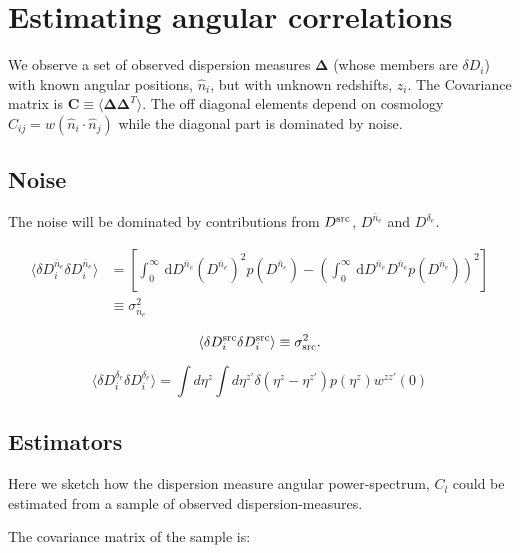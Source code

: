 \documentclass[onecolumn,prd,noshowpacs,nofootinbib,amsmath,amssymb]{revtex4}
\newcommand{\Dne}{D^{\bar{n}_e}}
\newcommand{\Dde}{D^{\delta_e}}
\newcommand{\Dsrc}{D^{\rm src}}
\newcommand{\ud}{\,\mathrm{d}}
\begin{document}
\section{Estimating angular correlations}

We observe a set of observed dispersion measures
$\boldsymbol \Delta$ (whose members are $\delta D_i$)
with known angular positions, $\hat n_i$, but with unknown
redshifts, $z_i$.  The Covariance matrix is
${\boldsymbol C} \equiv
\langle \boldsymbol \Delta \boldsymbol \Delta^T \rangle$.
The off diagonal elements depend on cosmology
$C_{ij} = w(\hat{n}_i\cdot\hat{n}_j)$ while the diagonal part is dominated by noise.

\subsection{Noise}

The noise will be dominated by contributions from $\Dsrc$, $\Dne$ and $\Dde$.

\begin{align}
    \label{e:sig_nebar}
    \langle \delta D^{\bar{n}_e}_i \delta D^{\bar{n}_e}_i \rangle
        &= \left[ \int_0^\infty \ud D^{\bar{n}_e} (D^{\bar{n}_e})^2
            p(D^{\bar{n}_e})
            - \left( \int_0^\infty \ud D^{\bar{n}_e} D^{\bar{n}_e}
        p(D^{\bar{n}_e}) \right)^2 \right]\\
        &\equiv  \sigma_{\bar{n}_e}^2
\end{align}

\begin{equation}
    \label{e:sig_src}
    \langle \delta D^{\rm src}_i \delta D^{\rm src}_i \rangle
    \equiv \sigma^2_{\rm src}.
\end{equation}

\begin{equation}
    \label{e:sig_delta}
    \langle \delta \Dde_i \delta \Dde_i \rangle
		= \int d\eta^z \int d\eta^{z'} \delta(\eta^z - \eta^{z'}) 
		p(\eta^{z}) w^{z z'}(0)
\end{equation}

\subsection{Estimators}

Here we sketch how the dispersion measure angular power-spectrum, $C_l$
could be estimated from a sample of observed dispersion-measures.

The covariance matrix of the sample is:
\end{document}
